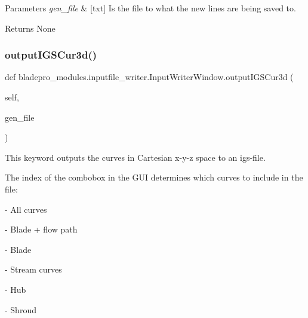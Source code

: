 \begin{DoxyParams}{Parameters}
{\em gen\+\_\+file} & \mbox{[}txt\mbox{]} Is the file to what the new lines are being saved to. \\
\hline
\end{DoxyParams}
\begin{DoxyReturn}{Returns}
None 
\end{DoxyReturn}
\hypertarget{classbladepro__modules_1_1inputfile__writer_1_1_input_writer_window_a394d61e8d66fde036f84746086d6c687}{}\label{classbladepro__modules_1_1inputfile__writer_1_1_input_writer_window_a394d61e8d66fde036f84746086d6c687} 
\subsubsection{\texorpdfstring{output\+I\+G\+S\+Cur3d()}{outputIGSCur3d()}}
{\footnotesize\ttfamily def bladepro\+\_\+modules.\+inputfile\+\_\+writer.\+Input\+Writer\+Window.\+output\+I\+G\+S\+Cur3d (\begin{DoxyParamCaption}\item[{}]{self,  }\item[{}]{gen\+\_\+file }\end{DoxyParamCaption})}



This keyword outputs the curves in Cartesian x-\/y-\/z space to an igs-\/file. 

The index of the combobox in the G\+UI determines which curves to include in the file\+:

\begin{DoxyItemize}
\item {} -\/ All curves \item {} -\/ Blade + flow path \item {} -\/ Blade \item {} -\/ Stream curves \item {} -\/ Hub \item {} -\/ Shroud\end{DoxyItemize}

